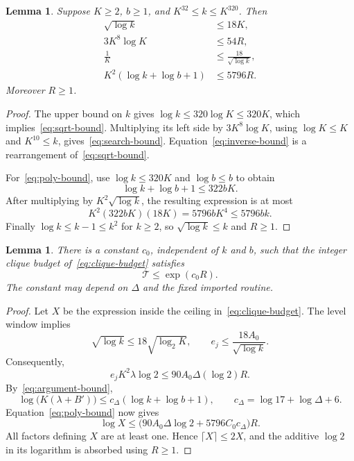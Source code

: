 \documentclass[11pt,reqno]{amsart}
\numberwithin{equation}{section}
\newtheorem{lemma}[theorem]{Lemma}
\theoremstyle{definition}
\theoremstyle{remark}
\begin{document}
\begin{lemma}\label{lem:overheads}
Suppose $K\ge2$, $b\ge1$, and $K^{32}\le k\le K^{320}$. Then
\begin{align}
 \sqrt{\log k}&\le18K,\label{eq:sqrt-bound}\\
 3K^8\log K&\le54R,\label{eq:search-bound}\\
 \frac1K&\le\frac{18}{\sqrt{\log k}},\label{eq:inverse-bound}\\
 K^2(\log k+\log b+1)&\le5796R.\label{eq:poly-bound}
\end{align}
Moreover $R\ge1$.
\end{lemma}
\begin{proof}
The upper bound on $k$ gives $\log k\le320\log K\le320K$, which implies~\eqref{eq:sqrt-bound}. Multiplying its left side by $3K^8\log K$, using $\log K\le K$ and $K^{10}\le k$, gives~\eqref{eq:search-bound}. Equation~\eqref{eq:inverse-bound} is a rearrangement of~\eqref{eq:sqrt-bound}.

For~\eqref{eq:poly-bound}, use $\log k\le320K$ and $\log b\le b$ to obtain
\[
 \log k+\log b+1\le322bK.
\]
After multiplying by $K^2\sqrt{\log k}$, the resulting expression is at most
\[
 K^2(322bK)(18K)=5796bK^4\le5796bk.
\]
Finally $\log k\le k-1\le k^2$ for $k\ge2$, so $\sqrt{\log k}\le k$ and $R\ge1$.
\end{proof}

\begin{lemma}\label{lem:budget}
There is a constant $c_0$, independent of $k$ and $b$, such that the integer clique budget of~\eqref{eq:clique-budget} satisfies
\begin{equation}\label{eq:budget-absorbed}
 \mathcal T\le\exp(c_0R).
\end{equation}
The constant may depend on $\Delta$ and the fixed imported routine.
\end{lemma}
\begin{proof}
Let $X$ be the expression inside the ceiling in~\eqref{eq:clique-budget}. The level window implies
\[
 \sqrt{\log k}\le18\sqrt{\log_2K},
 \qquad e_j\le\frac{18A_0}{\sqrt{\log k}}.
\]
Consequently,
\[
 e_jK^2\lambda\log2\le90A_0\Delta(\log2)R.
\]
By~\eqref{eq:argument-bound},
\[
 \log\bigl(K(\lambda+B')\bigr)
 \le c_\Delta(\log k+\log b+1),
 \qquad c_\Delta=\log17+\log\Delta+6.
\]
Equation~\eqref{eq:poly-bound} now gives
\[
 \log X
 \le\bigl(90A_0\Delta\log2+5796C_0c_\Delta\bigr)R.
\]
All factors defining $X$ are at least one. Hence $\lceil X\rceil\le2X$, and the additive $\log2$ in its logarithm is absorbed using $R\ge1$.
\end{proof}
\end{document}
